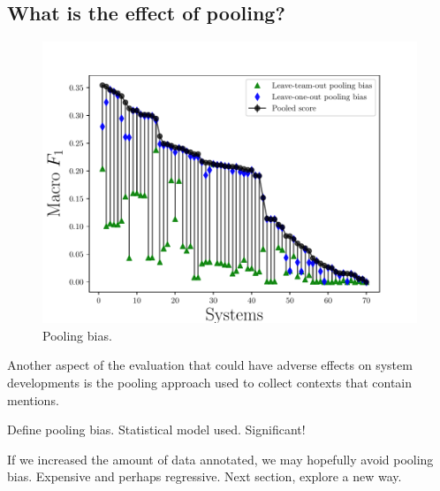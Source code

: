 \subsection{What is the effect of pooling?}

\begin{figure}
  \includegraphics[width=\columnwidth]{figures/experiment2}
  \caption{Pooling bias.}
\end{figure}

Another aspect of the evaluation that could have adverse effects on system developments is the pooling approach used to collect contexts that contain mentions.

Define pooling bias. Statistical model used.
Significant!

If we increased the amount of data annotated, we may hopefully avoid pooling bias.
Expensive and perhaps regressive.
Next section, explore a new way.

